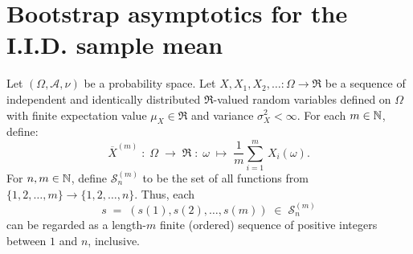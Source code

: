 
\newcommand{\Wpo}{\mathcal{W}^{p}_{1}}
\newcommand{\Wto}{\mathcal{W}^{2}_{1}\!\left(\Re,\mathcal{B}(\Re)\right)}
\newcommand{\Wt}{W_{2}}
\newcommand{\MoR}{\mathcal{M}_{1}(\Re,\mathcal{B}(\Re))}


\section{Bootstrap asymptotics for the I.I.D. sample mean}
\setcounter{theorem}{0}
\setcounter{equation}{0}

\newcommand{\Snm}{\mathcal{S}^{(m)}_{n}}
\newcommand{\Xnm}{\overline{X}^{(m)}_{n}}

\begin{theorem}
\mbox{}\vskip 0.1cm
\noindent
Let $\left(\Omega,\mathcal{A},\nu\right)$ be a probability space.
Let $X, X_{1}, X_{2}, \ldots : \Omega \longrightarrow \Re$ be a sequence
of independent and identically distributed $\Re$-valued random variables
defined on $\Omega$
{\color{red}with finite expectation value $\mu_{X} \in \Re$ and variance $\sigma^{2}_{X} < \infty$}.
For each $m \in \mathbb{N}$, define:
\begin{equation*}
\overline{X}^{(m)} \;:\; \Omega \; \longrightarrow \; \Re \;:\; \omega \; \longmapsto \; \dfrac{1}{m}\sum^{m}_{i=1}\,X_{i}(\omega).
\end{equation*}
For $n, m \in \mathbb{N}$, define $\Snm$ to be the set of all functions from $\{1,2,\ldots,m\} \longrightarrow \{1,2,\ldots,n\}$.
Thus, each
\begin{equation*}
s \; = \; \left(s(1), s(2), \ldots, s(m) \right) \;\in\; \Snm
\end{equation*}
can be regarded as a length-$m$ finite (ordered) sequence of positive integers between $1$ and $n$, inclusive.

\end{theorem}
